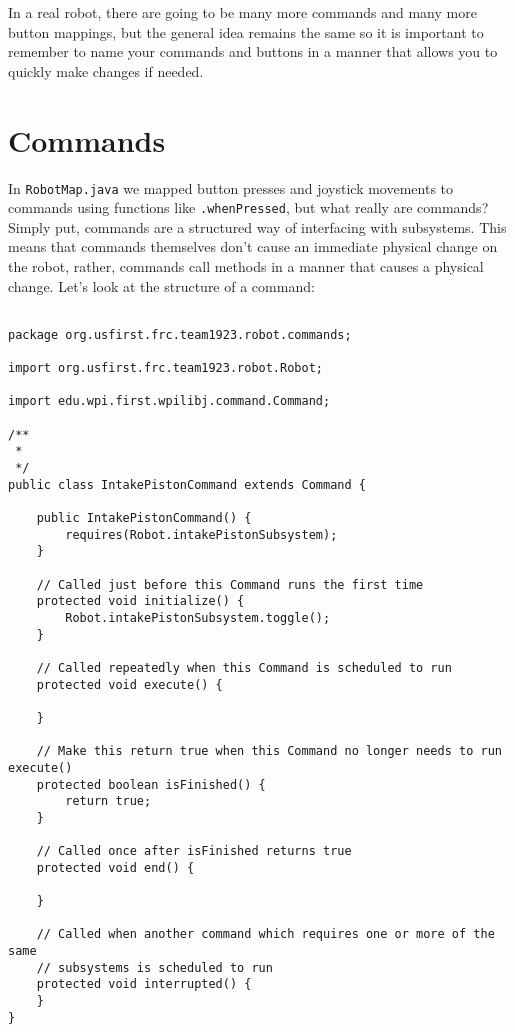 \documentclass[11pt,fleqn]{article}
\begin{document}
In a real robot, there are going to be many more commands and many more button mappings, but the general
idea remains the same so it is important to remember to name your commands and buttons in a manner that
allows you to quickly make changes if needed.

\section{Commands}
In \texttt{RobotMap.java} we mapped button presses and joystick movements to commands using
functions like \texttt{.whenPressed}, but what really are commands? Simply put, commands are a
structured way of interfacing with subsystems. This means that commands themselves don't cause an
immediate physical change on the robot, rather, commands call methods in a manner that causes a
physical change. Let's look at the structure of a command:

\begin{verbatim}

package org.usfirst.frc.team1923.robot.commands;

import org.usfirst.frc.team1923.robot.Robot;

import edu.wpi.first.wpilibj.command.Command;

/**
 *
 */
public class IntakePistonCommand extends Command {

    public IntakePistonCommand() {
        requires(Robot.intakePistonSubsystem);
    }

    // Called just before this Command runs the first time
    protected void initialize() {
        Robot.intakePistonSubsystem.toggle();
    }

    // Called repeatedly when this Command is scheduled to run
    protected void execute() {

    }

    // Make this return true when this Command no longer needs to run execute()
    protected boolean isFinished() {
        return true;
    }

    // Called once after isFinished returns true
    protected void end() {

    }

    // Called when another command which requires one or more of the same
    // subsystems is scheduled to run
    protected void interrupted() {
    }
}
\end{verbatim}
\end{document}

